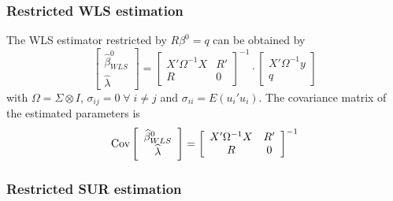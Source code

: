 \subsubsection{Restricted WLS estimation}

The WLS estimator restricted by $R \beta^0 = q$ can be obtained by
\begin{equation}
   \left[ \begin{array}{c}
      \widehat{\beta}^0_{WLS} \\ \widehat{\lambda}
   \end{array} \right]
   =
   \left[ \begin{array}{cc}
      X' \Omega^{-1} X & R' \\ 
      R & 0
   \end{array} \right]^{-1}
   \cdot
   \left[ \begin{array}{c}
      X' \Omega^{-1} y \\ q 
   \end{array} \right]
\end{equation}
with $\Omega = \Sigma \otimes I$, 
$\sigma_{ij} = 0 \; \forall \; i \neq j$ and
$\sigma_{ii} = E \left( u_i' u_i \right)$.
The covariance matrix of the estimated parameters is
\begin{equation}
   \text{Cov} 
   \left[ \begin{array}{c}
      \widehat{\beta}^0_{WLS} \\ \widehat{\lambda}
   \end{array} \right] 
   = 
   \left[ \begin{array}{cc}
      X' \Omega^{-1} X & R' \\ 
      R & 0
   \end{array} \right]^{-1}
\end{equation}

\subsubsection{Restricted SUR estimation}

